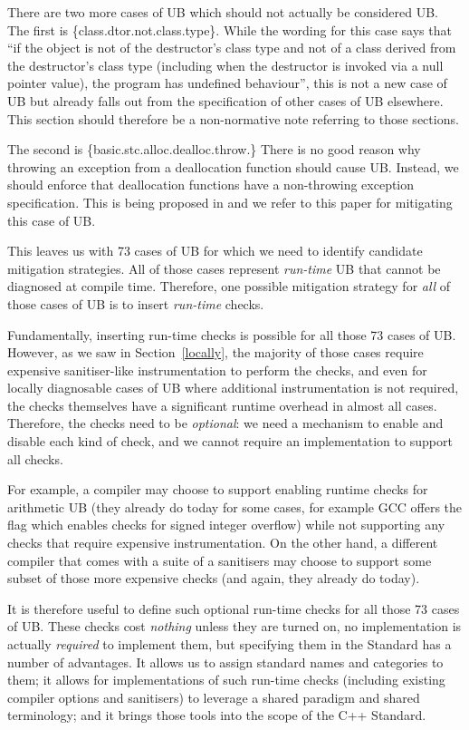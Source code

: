 There are two more cases of UB which should not actually be considered UB. The first is \{class.dtor.not.class.type\}. While the wording for this case says that ``if the object is not of the destructor's class type and not of a class derived from the destructor's class type (including when the destructor is invoked via a null pointer value), the program has undefined behaviour'', this is not a new case of UB but already falls out from the specification of other cases of UB elsewhere. This section should therefore be a non-normative note referring to those sections.

The second is \{basic.stc.alloc.dealloc.throw.\} There is no good reason why throwing an exception from a deallocation function should cause UB. Instead, we should enforce that deallocation functions have a non-throwing exception specification. This is being proposed in \cite{P3424R0} and we refer to this paper for mitigating this case of UB.

This leaves us with 73 cases of UB for which we need to identify candidate mitigation strategies. All of those cases represent \emph{run-time} UB that cannot be diagnosed at compile time. Therefore, one possible mitigation strategy for \emph{all} of those cases of UB is to insert \emph{run-time} checks.

Fundamentally, inserting run-time checks is possible for all those 73 cases of UB. However, as we saw in Section~\ref{locally}, the majority of those cases require expensive sanitiser-like instrumentation to perform the checks, and even for locally diagnosable cases of UB where additional instrumentation is not required, the checks themselves have a significant runtime overhead in almost all cases. Therefore, the checks need to be \emph{optional}: we need a mechanism to enable and disable each kind of check, and we cannot require an implementation to support all checks.

For example, a compiler may choose to support enabling runtime checks for arithmetic UB (they already do today for some cases, for example GCC offers the  flag which enables checks for signed integer overflow) while not supporting any checks that require expensive instrumentation. On the other hand, a different compiler that comes with a suite of a sanitisers may choose to support some subset of those more expensive checks (and again, they already do today).

It is therefore useful to define such optional run-time checks for all those 73 cases of UB. These checks cost \emph{nothing} unless they are turned on, no implementation is actually \emph{required} to implement them, but specifying them in the Standard has a number of advantages. It allows us to assign standard names and categories to them; it allows for implementations of such run-time checks (including existing compiler options and sanitisers) to leverage a shared paradigm and shared terminology; and it brings those tools into the scope of the C++ Standard.   

